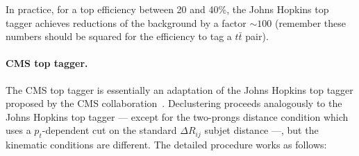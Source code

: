In practice, for a top efficiency between 20 and 40\%, the Johns
Hopkins top tagger achieves reductions of the background by a factor
$\sim 100$ (remember these numbers should be squared for the
efficiency to tag a $t\bar t$ pair).

\paragraph{CMS top tagger.}  The CMS top tagger is essentially an
adaptation of the Johns Hopkins top tagger proposed by the CMS
collaboration~\cite{CMS:2009lxa,CMS:2014fya}. Declustering proceeds analogously to the Johns Hopkins top tagger --- except for the
two-prongs distance condition which uses a $p_t$-dependent cut on the
standard $\Delta R_{ij}$ subjet distance ---, but the kinematic
conditions are different. The detailed procedure works as follows:
%
